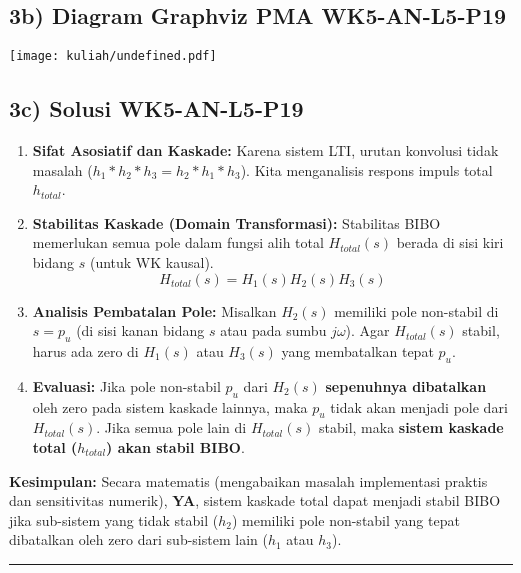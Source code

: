 \documentclass[
  letterpaper,
  DIV=11,
  numbers=noendperiod]{scrreprt}
\providecommand{\tightlist}{%
  \setlength{\itemsep}{0pt}\setlength{\parskip}{0pt}}
\begin{document}
\subsection{3b) Diagram Graphviz PMA
WK5-AN-L5-P19}\label{b-diagram-graphviz-pma-wk5-an-l5-p19}

\texttt{[image: kuliah/undefined.pdf]}

\subsection{3c) Solusi WK5-AN-L5-P19}\label{c-solusi-wk5-an-l5-p19}

\begin{enumerate}
\def\labelenumi{\arabic{enumi}.}
\tightlist
\item
  \textbf{Sifat Asosiatif dan Kaskade:} Karena sistem LTI, urutan
  konvolusi tidak masalah (\(h_1 * h_2 * h_3 = h_2 * h_1 * h_3\)). Kita
  menganalisis respons impuls total \(h_{total}\).
\item
  \textbf{Stabilitas Kaskade (Domain Transformasi):} Stabilitas BIBO
  memerlukan semua pole dalam fungsi alih total \(H_{total}(s)\) berada
  di sisi kiri bidang \(s\) (untuk WK kausal).
  \[H_{total}(s) = H_1(s) H_2(s) H_3(s)\]
\item
  \textbf{Analisis Pembatalan Pole:} Misalkan \(H_2(s)\) memiliki pole
  non-stabil di \(s = p_u\) (di sisi kanan bidang \(s\) atau pada sumbu
  \(j\omega\)). Agar \(H_{total}(s)\) stabil, harus ada zero di
  \(H_1(s)\) atau \(H_3(s)\) yang membatalkan tepat \(p_u\).
\item
  \textbf{Evaluasi:} Jika pole non-stabil \(p_u\) dari \(H_2(s)\)
  \textbf{sepenuhnya dibatalkan} oleh zero pada sistem kaskade lainnya,
  maka \(p_u\) tidak akan menjadi pole dari \(H_{total}(s)\). Jika semua
  pole lain di \(H_{total}(s)\) stabil, maka \textbf{sistem kaskade
  total (\(h_{total}\)) akan stabil BIBO}.
\end{enumerate}

\textbf{Kesimpulan:} Secara matematis (mengabaikan masalah implementasi
praktis dan sensitivitas numerik), \textbf{YA}, sistem kaskade total
dapat menjadi stabil BIBO jika sub-sistem yang tidak stabil (\(h_2\))
memiliki pole non-stabil yang tepat dibatalkan oleh zero dari sub-sistem
lain (\(h_1\) atau \(h_3\)).

\begin{center}\rule{0.5\linewidth}{0.5pt}\end{center}

\end{document}
